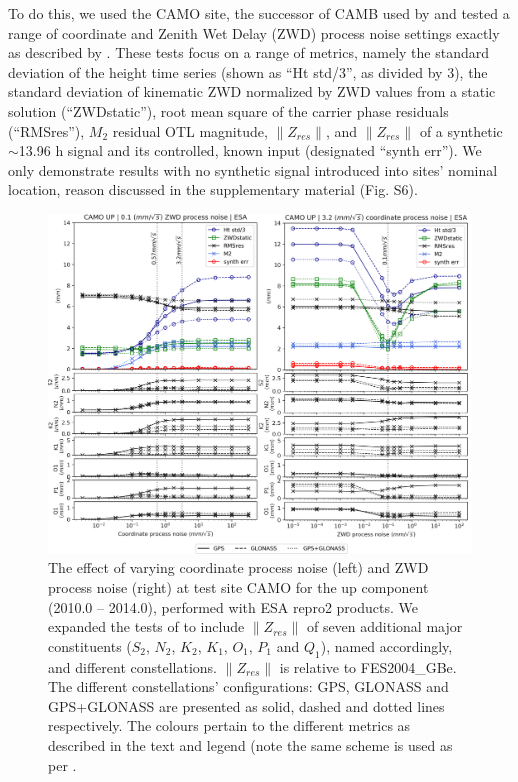 \documentclass[se, manuscript]{copernicus}
\begin{document}
To do this, we used the CAMO site, the successor of CAMB used by \cite{Penna2015} and tested a range of coordinate and Zenith Wet Delay (ZWD) process noise settings exactly as described by \cite{Penna2015}. These tests focus on a range of metrics, namely the standard deviation of the height time series (shown as “Ht std/3”, as divided by 3), the standard deviation of kinematic ZWD normalized by ZWD values from a static solution (“ZWDstatic”), root mean square of the carrier phase residuals (“RMSres”), $M_2$ residual OTL magnitude, $\|Z_{res}\|$, and $\|Z_{res}\|$ of a synthetic $\sim$13.96 h signal and its controlled, known input (designated “synth err”). We only demonstrate results with no synthetic signal introduced into sites’ nominal location, reason discussed in the supplementary material (Fig. S6).
\begin{figure}[t]
\includegraphics[width=17cm]{fig02.png}
\caption{The effect of varying coordinate process noise (left) and ZWD process noise (right) at test site CAMO for the up component (2010.0 – 2014.0), performed with ESA repro2 products. We expanded the tests of \cite{Penna2015} to include $\|Z_{res}\|$ of seven additional major constituents ($S_2$, $N_2$, $K_2$, $K_1$, $O_1$, $P_1$ and $Q_1$), named accordingly, and different constellations. $\|Z_{res}\|$ is relative to FES2004\_GBe. The different constellations’ configurations: GPS, GLONASS and GPS+GLONASS are presented as solid, dashed and dotted lines respectively. The colours pertain to the different metrics as described in the text and legend (note the same scheme is used as per \cite{Penna2015}. }
\end{figure}
\end{document}
